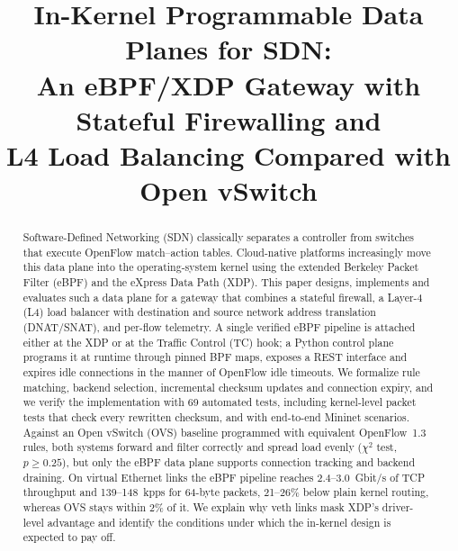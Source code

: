 \documentclass[conference]{IEEEtran}
\begin{document}
\title{In-Kernel Programmable Data Planes for SDN:\\
An eBPF/XDP Gateway with Stateful Firewalling and\\
L4 Load Balancing Compared with Open vSwitch}

\author{
}

\maketitle

\begin{abstract}
Software-Defined Networking (SDN) classically separates a controller from
switches that execute OpenFlow match--action tables. Cloud-native platforms
increasingly move this data plane into the operating-system kernel using the
extended Berkeley Packet Filter (eBPF) and the eXpress Data Path (XDP). This
paper designs, implements and evaluates such a data plane for a gateway that
combines a stateful firewall, a Layer-4 (L4) load balancer with destination
and source network address translation (DNAT/SNAT), and per-flow telemetry.
A single verified eBPF pipeline is attached either at the XDP or at the
Traffic Control (TC) hook; a Python control plane programs it at runtime
through pinned BPF maps, exposes a REST interface and expires idle connections
in the manner of OpenFlow idle timeouts. We formalize rule matching, backend
selection, incremental checksum updates and connection expiry, and we verify
the implementation with 69 automated tests, including kernel-level
packet tests that check every rewritten checksum, and with end-to-end Mininet
scenarios. Against an Open vSwitch (OVS) baseline programmed with equivalent
OpenFlow~1.3 rules, both systems forward and filter correctly and spread load
evenly ($\chi^2$ test, $p \ge 0.25$), but only the eBPF data plane supports
connection tracking and backend draining. On virtual Ethernet links the eBPF
pipeline reaches 2.4--3.0~Gbit/s of TCP throughput and 139--148~kpps for
64-byte packets, 21--26\% below plain kernel routing, whereas OVS stays within
2\% of it. We explain why veth links mask XDP's driver-level advantage and
identify the conditions under which the in-kernel design is expected to pay
off.
\end{abstract}
\end{document}
